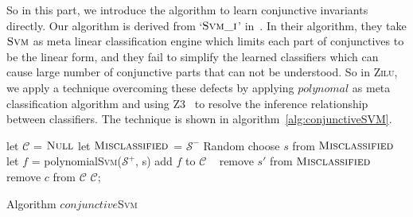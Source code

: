 So in this part, we introduce the algorithm to learn conjunctive invariants directly.
Our algorithm is derived from `$\textsc{Svm\_i}$' in~\cite{sharma2012interpolants}.
In their algorithm, they take $\textsc{Svm}$ as meta linear classification engine which limits each part of conjunctives to be the linear form, 
and they fail to simplify the learned classifiers which can cause large number of conjunctive parts that can not be understood.
So in \textsc{Zilu}, we apply a technique overcoming these defects by applying $polynomal$ as meta classification algorithm 
and using Z3~\cite{de2008z3} to resolve the inference relationship between classifiers.
The technique is shown in algorithm~\ref{alg:conjunctiveSVM}.%

\begin{algorithm}[!h]
\SetAlgoVlined
\Indm
{}
\Indp
    let $\mathcal{C}$ = $\textsc{Null}$\;
    let $\textsc{Misclassified}$ = $\mathcal{S}^-$\;
     {
        Random choose $s$ from $\textsc{Misclassified}$\;
        let $f$ = polynomial\textsc{Svm}($\mathcal{S}^+$, s)\;
        add $f$ to $\mathcal{C}$\;
         {\
             {
                remove $s'$ from $\textsc{Misclassified}$\;
            }
        }
     {
         {
            remove $c$ from $\mathcal{C}$\;
        }
    }
    }
    \Return $\mathcal{C}$;
\caption{Algorithm $conjunctive$\textsc{Svm}}
\label{alg:conjunctiveSVM}
\end{algorithm}




